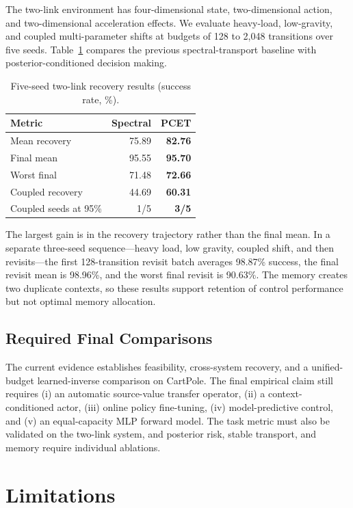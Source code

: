 \documentclass[letterpaper]{article}
\begin{document}
The two-link environment has four-dimensional state, two-dimensional action,
and two-dimensional acceleration effects.  We evaluate heavy-load, low-gravity,
and coupled multi-parameter shifts at budgets of 128 to 2,048 transitions over
five seeds.  Table~\ref{tab:twolink} compares the previous spectral-transport
baseline with posterior-conditioned decision making.

\begin{table}[t]
\centering
\small
\caption{Five-seed two-link recovery results (success rate, \%).}
\label{tab:twolink}
\begin{tabular}{@{}lrr@{}}
\toprule
Metric & Spectral & PCET \\
\midrule
Mean recovery & 75.89 & \textbf{82.76} \\
Final mean & 95.55 & \textbf{95.70} \\
Worst final & 71.48 & \textbf{72.66} \\
Coupled recovery & 44.69 & \textbf{60.31} \\
Coupled seeds at 95\% & 1/5 & \textbf{3/5} \\
\bottomrule
\end{tabular}
\end{table}

The largest gain is in the recovery trajectory rather than the final mean.  In
a separate three-seed sequence---heavy load, low gravity, coupled shift, and
then revisits---the first 128-transition revisit batch averages 98.87\%
success, the final revisit mean is 98.96\%, and the worst final revisit is
90.63\%.  The memory creates two duplicate contexts, so these results support
retention of control performance but not optimal memory allocation.

\subsection{Required Final Comparisons}

The current evidence establishes feasibility, cross-system recovery, and a
unified-budget learned-inverse comparison on CartPole.  The final empirical
claim still requires (i) an automatic source-value transfer operator, (ii) a context-conditioned actor, (iii) online policy
fine-tuning, (iv) model-predictive control, and (v) an equal-capacity MLP
forward model.  The task metric must also be validated on the two-link system,
and posterior risk, stable transport, and memory require individual ablations.

\section{Limitations}
\end{document}
